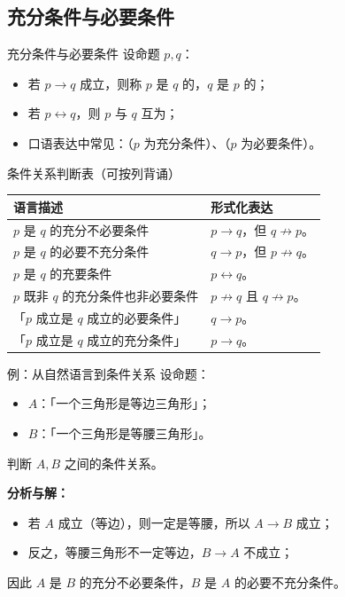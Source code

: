 \documentclass[a4paper,11pt]{ctexart}
\begin{document}
\subsection{充分条件与必要条件}

\begin{definitionbox}{充分条件与必要条件}
  设命题 $p,q$：
  \begin{itemize}
    \item 若 $p\to q$ 成立，则称 $p$ 是 $q$ 的，$q$ 是 $p$ 的；
    \item 若 $p\leftrightarrow q$，则 $p$ 与 $q$ 互为；
    \item 口语表达中常见：（$p$ 为充分条件）、（$p$ 为必要条件）。
  \end{itemize}
\end{definitionbox}

\begin{summarybox}{条件关系判断表（可按列背诵）}
  \begin{center}
  \begin{tabularx}{0.98\textwidth}{>{\raggedright\arraybackslash}p{4.2cm}X}
    \toprule
    \textbf{语言描述} & \textbf{形式化表达} \\
    \midrule
    $p$ 是 $q$ 的充分不必要条件 & $p\to q$，但 $q\not\to p$。 \\
    $p$ 是 $q$ 的必要不充分条件 & $q\to p$，但 $p\not\to q$。 \\
    $p$ 是 $q$ 的充要条件 & $p\leftrightarrow q$。 \\
    $p$ 既非 $q$ 的充分条件也非必要条件 & $p\not\to q$ 且 $q\not\to p$。 \\
    「$p$ 成立是 $q$ 成立的必要条件」 & $q\to p$。 \\
    「$p$ 成立是 $q$ 成立的充分条件」 & $p\to q$。 \\
    \bottomrule
  \end{tabularx}
  \end{center}
\end{summarybox}

\begin{examplebox}{例：从自然语言到条件关系}
  设命题：
  \begin{itemize}
    \item $A$：「一个三角形是等边三角形」；
    \item $B$：「一个三角形是等腰三角形」。
  \end{itemize}
  判断 $A,B$ 之间的条件关系。

  \textbf{分析与解：}
  \begin{itemize}
    \item 若 $A$ 成立（等边），则一定是等腰，所以 $A\to B$ 成立；
    \item 反之，等腰三角形不一定等边，$B\to A$ 不成立；
  \end{itemize}
  因此 $A$ 是 $B$ 的充分不必要条件，$B$ 是 $A$ 的必要不充分条件。
\end{examplebox}
\end{document}
